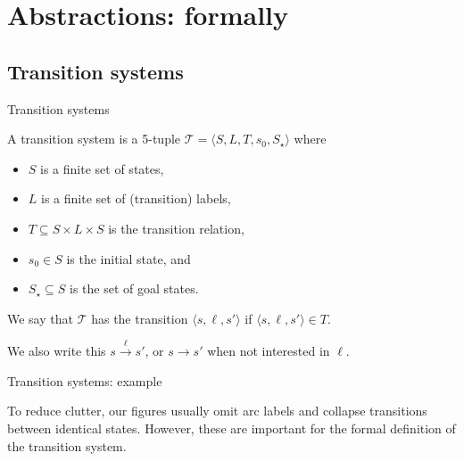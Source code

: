 \documentclass{gkibeamer}
\begin{document}
\section{Abstractions: formally}
\subsection{Transition systems}

\begin{frame}{Transition systems}
  \begin{definition}
    A \alert{transition system} is a 5-tuple $\mathcal T = \langle S,
    L, T, s_0, S_\star\rangle$ where
    \begin{itemize}
    \item $S$ is a finite set of \alert{states},
    \item $L$ is a finite set of (transition) \alert{labels},
    \item $T \subseteq S \times L \times S$ is the \alert{transition
      relation},
    \item $s_0 \in S$ is the \alert{initial state}, and
    \item $S_\star \subseteq S$ is the set of \alert{goal states}.
    \end{itemize}
    We say that $\mathcal T$ \alert{has the transition} $\langle s, \ell,
    s'\rangle$ if $\langle s, \ell, s'\rangle \in T$.

    We also write this \alert{$s \xrightarrow{\ell} s'$}, or \alert{$s
      \rightarrow s'$} when not interested in $\ell$.
  \end{definition}
\end{frame}

\begin{frame}{Transition systems: example}
  \begin{center}
    \picfulltransitiongraphnolabels
  \end{center}
   To reduce clutter, our figures usually omit arc
  labels and collapse transitions between identical states. However,
  these are important for the formal definition of the transition
  system.
\end{frame}
\end{document}
